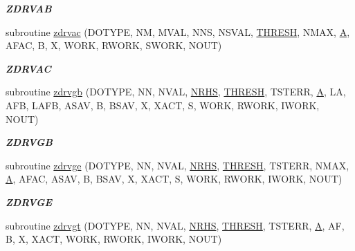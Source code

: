\begin{DoxyCompactItemize}
\begin{DoxyCompactList}\small\item\em {\bfseries Z\+D\+R\+V\+A\+B} \end{DoxyCompactList}\item 
subroutine \hyperlink{group__complex16__lin_ga17eb857b93d82c43fa9211c57359e5cb}{zdrvac} (D\+O\+T\+Y\+P\+E, N\+M, M\+V\+A\+L, N\+N\+S, N\+S\+V\+A\+L, \hyperlink{zlaqgs_8c_a0656018abfc9fa2821827415f5d5ea57}{T\+H\+R\+E\+S\+H}, N\+M\+A\+X, \hyperlink{classA}{A}, A\+F\+A\+C, B, X, W\+O\+R\+K, R\+W\+O\+R\+K, S\+W\+O\+R\+K, N\+O\+U\+T)
\begin{DoxyCompactList}\small\item\em {\bfseries Z\+D\+R\+V\+A\+C} \end{DoxyCompactList}\item 
subroutine \hyperlink{group__complex16__lin_ga7a56f534d7c30ddef71d909c9808f3b0}{zdrvgb} (D\+O\+T\+Y\+P\+E, N\+N, N\+V\+A\+L, \hyperlink{example__user_8c_aa0138da002ce2a90360df2f521eb3198}{N\+R\+H\+S}, \hyperlink{zlaqgs_8c_a0656018abfc9fa2821827415f5d5ea57}{T\+H\+R\+E\+S\+H}, T\+S\+T\+E\+R\+R, \hyperlink{classA}{A}, L\+A, A\+F\+B, L\+A\+F\+B, A\+S\+A\+V, B, B\+S\+A\+V, X, X\+A\+C\+T, S, W\+O\+R\+K, R\+W\+O\+R\+K, I\+W\+O\+R\+K, N\+O\+U\+T)
\begin{DoxyCompactList}\small\item\em {\bfseries Z\+D\+R\+V\+G\+B} \end{DoxyCompactList}\item 
subroutine \hyperlink{group__complex16__lin_ga517b2a3d5a1aaa88452df114ca216c1e}{zdrvge} (D\+O\+T\+Y\+P\+E, N\+N, N\+V\+A\+L, \hyperlink{example__user_8c_aa0138da002ce2a90360df2f521eb3198}{N\+R\+H\+S}, \hyperlink{zlaqgs_8c_a0656018abfc9fa2821827415f5d5ea57}{T\+H\+R\+E\+S\+H}, T\+S\+T\+E\+R\+R, N\+M\+A\+X, \hyperlink{classA}{A}, A\+F\+A\+C, A\+S\+A\+V, B, B\+S\+A\+V, X, X\+A\+C\+T, S, W\+O\+R\+K, R\+W\+O\+R\+K, I\+W\+O\+R\+K, N\+O\+U\+T)
\begin{DoxyCompactList}\small\item\em {\bfseries Z\+D\+R\+V\+G\+E} \end{DoxyCompactList}\item 
subroutine \hyperlink{group__complex16__lin_gac0379550d843e5f07198ac322dc9444c}{zdrvgt} (D\+O\+T\+Y\+P\+E, N\+N, N\+V\+A\+L, \hyperlink{example__user_8c_aa0138da002ce2a90360df2f521eb3198}{N\+R\+H\+S}, \hyperlink{zlaqgs_8c_a0656018abfc9fa2821827415f5d5ea57}{T\+H\+R\+E\+S\+H}, T\+S\+T\+E\+R\+R, \hyperlink{classA}{A}, A\+F, B, X, X\+A\+C\+T, W\+O\+R\+K, R\+W\+O\+R\+K, I\+W\+O\+R\+K, N\+O\+U\+T)

\end{DoxyCompactItemize}
